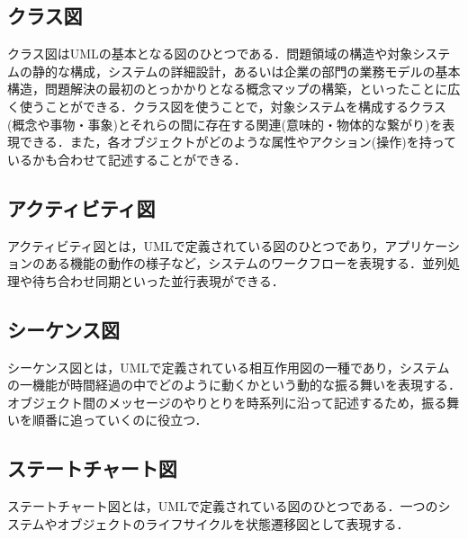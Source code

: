 \subsection*{クラス図\cite{uml}}

クラス図はUMLの基本となる図のひとつである．問題領域の構造や対象システムの静的な構成，システムの詳細設計，あるいは企業の部門の業務モデルの基本構造，問題解決の最初のとっかかりとなる概念マップの構築，といったことに広く使うことができる．クラス図を使うことで，対象システムを構成するクラス(概念や事物・事象)とそれらの間に存在する関連(意味的・物体的な繋がり)を表現できる．また，各オブジェクトがどのような属性やアクション(操作)を持っているかも合わせて記述することができる．

\subsection*{アクティビティ図\cite{uml}}

アクティビティ図とは，UMLで定義されている図のひとつであり，アプリケーションのある機能の動作の様子など，システムのワークフローを表現する．並列処理や待ち合わせ同期といった並行表現ができる．

\subsection*{シーケンス図\cite{uml}}

シーケンス図とは，UMLで定義されている相互作用図の一種であり，システムの一機能が時間経過の中でどのように動くかという動的な振る舞いを表現する．オブジェクト間のメッセージのやりとりを時系列に沿って記述するため，振る舞いを順番に追っていくのに役立つ．

\subsection*{ステートチャート図\cite{uml}}

ステートチャート図とは，UMLで定義されている図のひとつである．一つのシステムやオブジェクトのライフサイクルを状態遷移図として表現する．